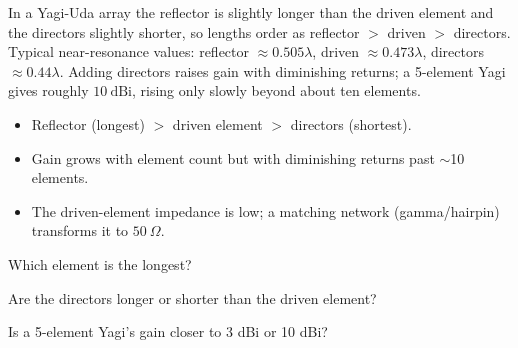 \begin{workedexample}
In a Yagi-Uda array the reflector is slightly longer than the driven
element and the directors slightly shorter, so lengths order as reflector $>$
driven $>$ directors. Typical near-resonance values: reflector $\approx 0.505\lambda$,
driven $\approx 0.473\lambda$, directors $\approx 0.44\lambda$. Adding directors
raises gain with diminishing returns; a 5-element Yagi gives roughly
$10\ \text{dBi}$, rising only slowly beyond about ten elements.
\end{workedexample}

\begin{keytakeaways}
\begin{itemize}[leftmargin=1.4em,itemsep=2pt]
\item Reflector (longest) $>$ driven element $>$ directors (shortest).
\item Gain grows with element count but with diminishing returns past $\sim$10 elements.
\item The driven-element impedance is low; a matching network (gamma/hairpin) transforms it to $50\ \Omega$.
\end{itemize}
\end{keytakeaways}

\begin{exercises}
\item Which element is the longest?
\item Are the directors longer or shorter than the driven element?
\item Is a 5-element Yagi's gain closer to 3 dBi or 10 dBi?
\end{exercises}

